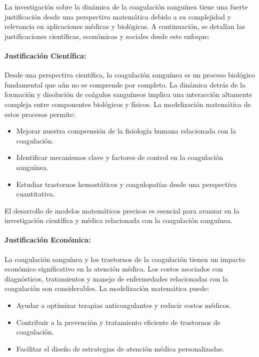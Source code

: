 \documentclass{article}
\begin{document}
La investigación sobre la dinámica de la coagulación sanguínea tiene una fuerte justificación desde una perspectiva matemática debido a su complejidad y relevancia en aplicaciones médicas y biológicas. A continuación, se detallan las justificaciones científicas, económicas y sociales desde este enfoque:

\paragraph{Justificación Científica:}

Desde una perspectiva científica, la coagulación sanguínea es un proceso biológico fundamental que aún no se comprende por completo. La dinámica detrás de la formación y disolución de coágulos sanguíneos implica una interacción altamente compleja entre componentes biológicos y físicos. La modelización matemática de estos procesos permite:

\begin{itemize}
    \item Mejorar nuestra comprensión de la fisiología humana relacionada con la coagulación.
    \item Identificar mecanismos clave y factores de control en la coagulación sanguínea.
    \item Estudiar trastornos hemostáticos y coagulopatías desde una perspectiva cuantitativa.
\end{itemize}

El desarrollo de modelos matemáticos precisos es esencial para avanzar en la investigación científica y médica relacionada con la coagulación sanguínea.

\paragraph{Justificación Económica:}

La coagulación sanguínea y los trastornos de la coagulación tienen un impacto económico significativo en la atención médica. Los costos asociados con diagnósticos, tratamientos y manejo de enfermedades relacionadas con la coagulación son considerables. La modelización matemática puede:

\begin{itemize}
    \item Ayudar a optimizar terapias anticoagulantes y reducir costos médicos.
    \item Contribuir a la prevención y tratamiento eficiente de trastornos de coagulación.
    \item Facilitar el diseño de estrategias de atención médica personalizadas.
\end{itemize}
\end{document}

